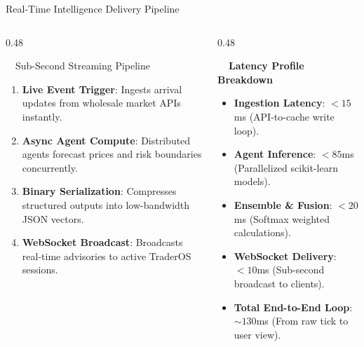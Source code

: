 \documentclass{beamer}
\begin{document}
\begin{frame}{Real-Time Intelligence Delivery Pipeline}
\vspace{-0.2cm}

\begin{columns}[T]
    \begin{column}{0.48\textwidth}
        \begin{infocard}{~~Sub-Second Streaming Pipeline}
            \fontsize{6.8pt}{8.5pt}\selectfont
            \begin{enumerate}\setlength\itemsep{3.5pt}\setlength\parskip{0pt}
                \item[\textbf{1.}] \textbf{Live Event Trigger}: Ingests arrival updates from wholesale market APIs instantly.
                \item[\textbf{2.}] \textbf{Async Agent Compute}: Distributed agents forecast prices and risk boundaries concurrently.
                \item[\textbf{3.}] \textbf{Binary Serialization}: Compresses structured outputs into low-bandwidth JSON vectors.
                \item[\textbf{4.}] \textbf{WebSocket Broadcast}: Broadcasts real-time advisories to active TraderOS sessions.
            \end{enumerate}
        \end{infocard}
    \end{column}
    
    \begin{column}{0.48\textwidth}
        \begin{smallcard}[0.98\textwidth, top=3pt, bottom=3pt, left=4pt, right=4pt, boxsep=0.5pt]
            \centering \textbf{\textcolor{primaryDark}{\small {}~~Latency Profile Breakdown}}
            \vspace{0.08cm}
            \fontsize{6.8pt}{8.2pt}\selectfont
            \begin{itemize}\setlength\itemsep{4.5pt}\setlength\parskip{0pt}
                \item \textbf{Ingestion Latency}: $<15$ms (API-to-cache write loop).
                \item \textbf{Agent Inference}: $<85$ms (Parallelized scikit-learn models).
                \item \textbf{Ensemble \& Fusion}: $<20$ms (Softmax weighted calculations).
                \item \textbf{WebSocket Delivery}: $<10$ms (Sub-second broadcast to clients).
                \item \textbf{Total End-to-End Loop}: $\sim 130$ms (From raw tick to user view).
            \end{itemize}
        \end{smallcard}
    \end{column}
\end{columns}


\end{frame}
\end{document}
